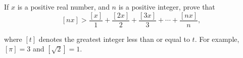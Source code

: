 If $x$ is a positive real number, and $n$ is a positive integer, prove that\[[ nx] > \frac{[ x]}1 + \frac{[ 2x]}2 +\frac{[ 3x]}3 + \cdots + \frac{[ nx]}n,\]

where $[t]$ denotes the greatest integer less than or equal to $t$. For example, $[ \pi] = 3$ and $\left[\sqrt2\right] = 1$.